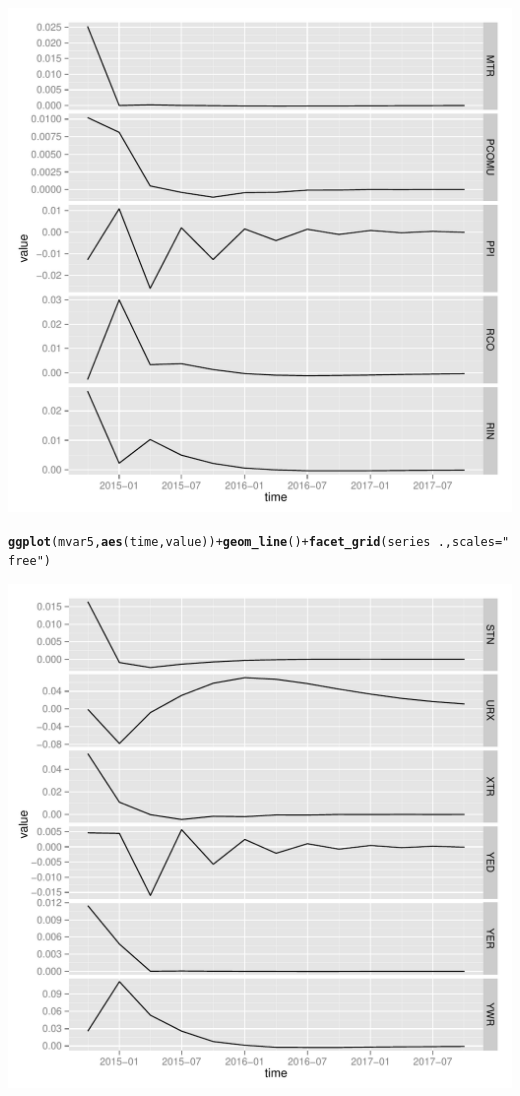 \documentclass[11pt,oneside, a4paper]{amsart}\usepackage[]{graphicx}\usepackage[]{color}
\makeatletter
\def\maxwidth{ %
  \ifdim\Gin@nat@width>\linewidth
    \linewidth
  \else
    \Gin@nat@width
  \fi
}
\newcommand{\hlstr}[1]{\textcolor[rgb]{0.192,0.494,0.8}{#1}}%
\newcommand{\hlopt}[1]{\textcolor[rgb]{0,0,0}{#1}}%
\newcommand{\hlstd}[1]{\textcolor[rgb]{0.345,0.345,0.345}{#1}}%
\newcommand{\hlkwc}[1]{\textcolor[rgb]{0.333,0.667,0.333}{#1}}%
\newcommand{\hlkwd}[1]{\textcolor[rgb]{0.737,0.353,0.396}{\textbf{#1}}}%
\newenvironment{kframe}{%
 \def\at@end@of@kframe{}%
 \ifinner\ifhmode%
  \def\at@end@of@kframe{\end{minipage}}%
  \begin{minipage}{\columnwidth}%
 \fi\fi%
 \def\FrameCommand##1{\hskip\@totalleftmargin \hskip-\fboxsep
 \colorbox{shadecolor}{##1}\hskip-\fboxsep
     \hskip-\linewidth \hskip-\@totalleftmargin \hskip\columnwidth}%
 \MakeFramed {\advance\hsize-\width
   \@totalleftmargin\z@ \linewidth\hsize
   \@setminipage}}%
 {\par\unskip\endMakeFramed%
 \at@end@of@kframe}
\newenvironment{knitrout}{}{} %
\makeatother
\begin{document}
\begin{knitrout}
\includegraphics[width=\maxwidth]{figure/unnamed-chunk-5-4} 
\begin{kframe}\begin{alltt}
\hlkwd{ggplot}\hlstd{(mvar5,} \hlkwd{aes}\hlstd{(time,value))} \hlopt{+} \hlkwd{geom_line}\hlstd{()} \hlopt{+} \hlkwd{facet_grid}\hlstd{(series} \hlopt{~} \hlstd{. ,}\hlkwc{scales}\hlstd{=}\hlstr{"free"}\hlstd{)}
\end{alltt}
\end{kframe}
\includegraphics[width=\maxwidth]{figure/unnamed-chunk-5-5} 

\end{knitrout}
\end{document}
